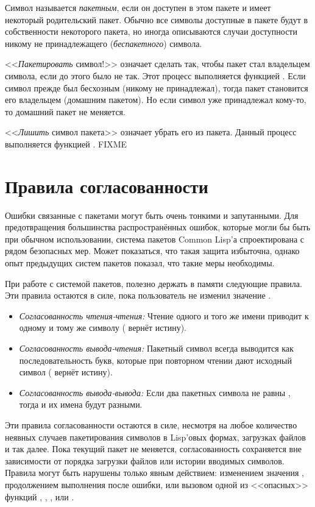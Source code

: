Символ называется \emph{пакетным}, если он доступен в этом
пакете и имеет некоторый родительский пакет. Обычно все символы
доступные в пакете будут в собственности некоторого пакета, но иногда
описываются случаи доступности никому не принадлежащего (\emph{беспакетного})
символа.

<<\emph{Пакетировать} символ!>> означает сделать так, чтобы
пакет стал владельцем символа, если до этого было не так.
Этот процесс выполняется функцией .
Если символ прежде был бесхозным (никому не принадлежал), тогда пакет становится
его владельцем (домашним пакетом). Но если символ уже принадлежал кому-то, то
домашний пакет не меняется.

<<\emph{Лишить} символ пакета>> означает убрать его из пакета. Данный
процесс выполняется функцией . FIXME

\section{Правила согласованности}

Ошибки связанные с пакетами могут быть очень тонкими и
запутанными. Для предотвращения большинства распространённых ошибок,
которые могли бы быть при обычном использовании, система пакетов
Common Lisp'а спроектирована с рядом безопасных мер. Может показаться,
что такая защита избыточна, однако опыт предыдущих систем пакетов
показал, что такие меры необходимы.

При работе с системой пакетов, полезно держать в памяти следующие правила.
Эти правила остаются в силе, пока пользователь не изменил значение .

\begin{itemize}
\item \emph{Согласованность чтения-чтения:} Чтение одного и того же
  имени приводит к одному и тому же символу ( вернёт истину).

\item \emph{Согласованность вывода-чтения:} Пакетный символ
  всегда выводится как последовательность букв, которые
  при повторном чтении дают исходный символ ( вернёт истину).

\item \emph{Согласованность вывода-вывода:} Если два пакетных
  символа не равны , тогда и их имена будут разными.
\end{itemize}

Эти правила согласованности остаются в силе, несмотря на любое
количество неявных случаев пакетирования символов в Lisp'овых формах,
загрузках файлов и так далее. Пока текущий пакет не меняется,
согласованность сохраняется вне зависимости от порядка загрузки файлов
или истории вводимых символов. Правила могут быть нарушены только
явным действием: изменением значения , продолжением
выполнения после ошибки, или вызовом одной из <<опасных>> функций
, , , 
или .

